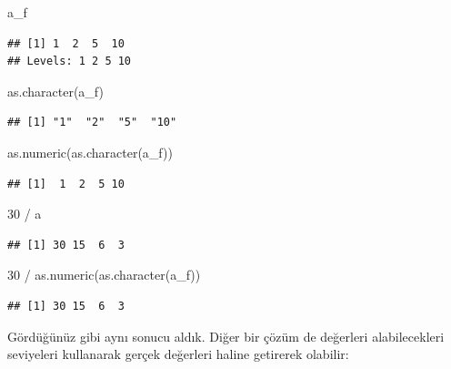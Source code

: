 \documentclass[
]{book}
\newenvironment{Shaded}{\begin{snugshade}}{\end{snugshade}}
\newcommand{\DecValTok}[1]{\textcolor[rgb]{0.00,0.00,0.81}{#1}}
\newcommand{\FunctionTok}[1]{\textcolor[rgb]{0.00,0.00,0.00}{#1}}
\newcommand{\NormalTok}[1]{#1}
\newcommand{\SpecialCharTok}[1]{\textcolor[rgb]{0.00,0.00,0.00}{#1}}
\begin{document}
\begin{Shaded}
\begin{Highlighting}[]
\NormalTok{a\_f}
\end{Highlighting}
\end{Shaded}

\begin{verbatim}
## [1] 1  2  5  10
## Levels: 1 2 5 10
\end{verbatim}

\begin{Shaded}
\begin{Highlighting}[]
\FunctionTok{as.character}\NormalTok{(a\_f)}
\end{Highlighting}
\end{Shaded}

\begin{verbatim}
## [1] "1"  "2"  "5"  "10"
\end{verbatim}

\begin{Shaded}
\begin{Highlighting}[]
\FunctionTok{as.numeric}\NormalTok{(}\FunctionTok{as.character}\NormalTok{(a\_f))}
\end{Highlighting}
\end{Shaded}

\begin{verbatim}
## [1]  1  2  5 10
\end{verbatim}

\begin{Shaded}
\begin{Highlighting}[]
\DecValTok{30} \SpecialCharTok{/}\NormalTok{ a }
\end{Highlighting}
\end{Shaded}

\begin{verbatim}
## [1] 30 15  6  3
\end{verbatim}

\begin{Shaded}
\begin{Highlighting}[]
\DecValTok{30} \SpecialCharTok{/} \FunctionTok{as.numeric}\NormalTok{(}\FunctionTok{as.character}\NormalTok{(a\_f))}
\end{Highlighting}
\end{Shaded}

\begin{verbatim}
## [1] 30 15  6  3
\end{verbatim}

Gördüğünüz gibi aynı sonucu aldık. Diğer bir çözüm de değerleri alabilecekleri seviyeleri kullanarak gerçek değerleri haline getirerek olabilir:
\end{document}

